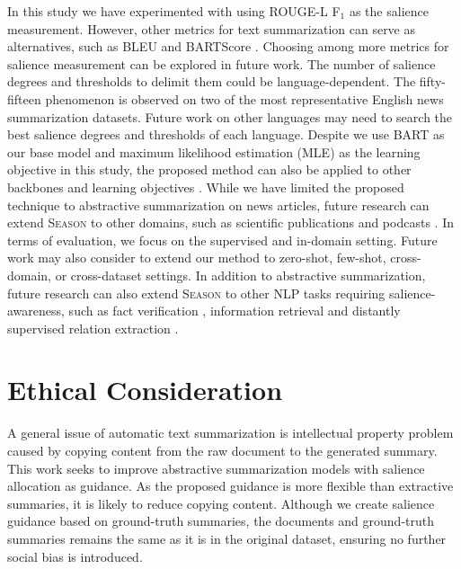 \documentclass[11pt]{article}
\newcommand{\MODEL}{\mbox{\textsc{Season}}\xspace}
\begin{document}
In this study we have experimented with using ROUGE-L F$_{1}$ as the salience measurement. However, other metrics for text summarization can serve as alternatives, such as BLEU \cite{papineni2002bleu} and BARTScore \cite{yuan2021bartscore}. Choosing among more metrics for salience measurement can be explored in future work.
The number of salience degrees and thresholds to delimit them could be language-dependent. The fifty-fifteen phenomenon is observed on two of the most representative English news summarization datasets. Future work on other languages may need to search the best salience degrees and thresholds of each language.
Despite we use BART as our base model and maximum likelihood estimation (MLE) as the learning objective in this study, the proposed method can also be applied to other backbones and learning objectives \cite{zhang2020pegasus,liu2021simcls,liu2022brio}.
While we have limited the proposed technique to abstractive summarization on news articles, future research can extend \MODEL to other domains, such as scientific publications \cite{cohan2018discourse} and podcasts \cite{song2022towards}.
In terms of evaluation, we focus on the supervised and in-domain setting. Future work may also consider to extend our method to zero-shot, few-shot, cross-domain, or cross-dataset settings.
In addition to abstractive summarization, future research can also extend \MODEL to other NLP tasks requiring salience-awareness, such as fact verification \cite{wang2021table}, information retrieval \cite{xiong2018towards} and distantly supervised relation extraction \cite{lin2016neural}.


 \section*{Ethical Consideration}
A general issue of automatic text summarization is intellectual property problem caused by copying content from the raw document to the generated summary. 
This work seeks to improve abstractive summarization models with salience allocation as guidance.
As the proposed guidance is more flexible than extractive summaries, it is likely to reduce copying content.
Although we create salience guidance based on ground-truth summaries, the documents and ground-truth summaries remains the same as it is in the original dataset, ensuring no further social bias is introduced. 

 



\clearpage
\appendix
\end{document}
